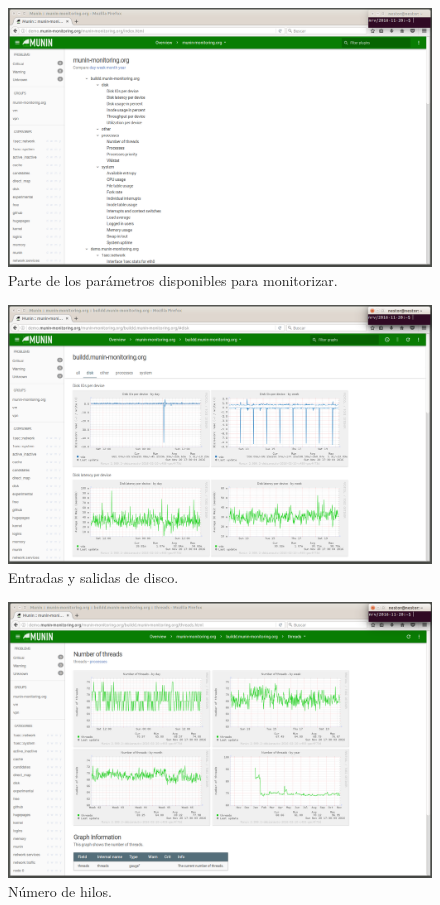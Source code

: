 \documentclass[a4paper,titlepage,12pt]{scrartcl}	%
\numberwithin{figure}{section} %
\numberwithin{table}{section} %
\begin{document}
	\begin{figure}[H]
		\centering
		\includegraphics[scale=0.28]{./Imagenes/6-1.png}
		\caption[Parte de los parámetros disponibles para monitorizar.]{Parte de los parámetros disponibles para monitorizar.}
		\label{6-1}
	\end{figure}
	
	\begin{figure}[H]
		\centering
		\includegraphics[scale=0.28]{./Imagenes/6-2.png}
		\caption[Entradas y salidas de disco.]{Entradas y salidas de disco.}
		\label{6-2}
	\end{figure}
	
	\begin{figure}[H]
		\centering
		\includegraphics[scale=0.27]{./Imagenes/6-3.png}
		\caption[Número de hilos.]{Número de hilos.}
		\label{6-3}
	\end{figure}
	
\end{document}
